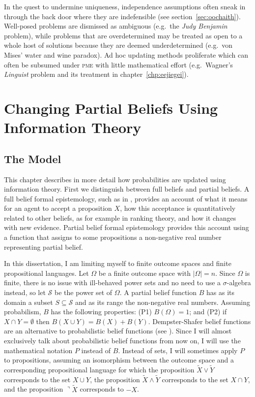 \documentclass[phd,12pt,oneside]{ubcthesis}
\begin{document}
In the quest to undermine uniqueness, independence assumptions often
sneak in through the back door where they are indefensible (see
section~\ref{sec:oochaith}). Well-posed problems are dismissed as
ambiguous (e.g.\ the \emph{Judy Benjamin} problem), while problems
that are overdetermined may be treated as open to a whole host of
solutions because they are deemed underdetermined (e.g.\ von Mises'
water and wine paradox). Ad hoc updating methods proliferate which can
often be subsumed under \textsc{pme} with little mathematical effort
(e.g.\ Wagner's \emph{Linguist} problem and its treatment in
chapter~\ref{chp:eejiegei}).

\chapter{Changing Partial Beliefs Using Information Theory}
\label{chp:oohoodee}

\section{The Model}
\label{sec:ipepheez}

This chapter describes in more detail how probabilities are updated
using information theory. First we distinguish between full beliefs
and partial beliefs. A full belief formal epistemology, such as in
, provides an account of what it means for an
agent to accept a proposition $X$, how this acceptance is
quantitatively related to other beliefs, as for example in ranking
theory, and how it changes with new evidence. Partial belief formal
epistemology provides this account using a function that assigns to
some propositions a non-negative real number representing partial
belief.

In this dissertation, I am limiting myself to finite outcome spaces
and finite propositional languages. Let $\Omega$ be a finite outcome
space with $|\Omega|=n$. Since $\Omega$ is finite, there is no issue
with ill-behaved power sets and no need to use a $\sigma$-algebra
instead, so let $\mathcal{S}$ be the power set of $\Omega$. A partial
belief function $B$ has as its domain a subset $S\subseteq\mathcal{S}$
and as its range the non-negative real numbers. Assuming probabilism,
$B$ has the following properties: (P1) $B(\Omega)=1$; and (P2) if
$X\cap{}Y=\emptyset$ then $B(X\cup{}Y)=B(X)+B(Y)$. Dempster-Shafer
belief functions are an alternative to probabilistic belief functions
(see ). Since I will almost exclusively talk
about probabilistic belief functions from now on, I will use the
mathematical notation $P$ instead of $B$. Instead of sets, I will
sometimes apply $P$ to propositions, assuming an isomorphism between
the outcome space and a corresponding propositional language for which
the proposition $\tilde{X}\vee{}\tilde{Y}$ corresponds to the set
$X\cup{}Y$, the proposition $\tilde{X}\wedge{}\tilde{Y}$ corresponds
to the set $X\cap{}Y$, and the proposition $\urcorner\tilde{X}$
corresponds to $-X$.
\end{document}
